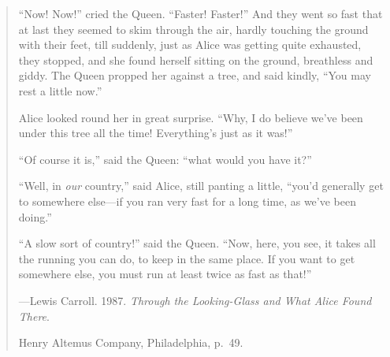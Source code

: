 

\cleardoublepage{}

\thispagestyle{empty} %

\vspace*{50 mm}

\small{}

\begin{quote}
	``Now! Now!'' cried the Queen. 
	``Faster! Faster!'' 
	And they went so fast that at last they seemed to skim through the air, 
	hardly touching the ground with their feet, 
	till suddenly, 
	just as Alice was getting quite exhausted, 
	they stopped, 
	and she found herself sitting on the ground, 
	breathless and giddy. 
	The Queen propped her against a tree, and said kindly, 
	``You may rest a little now.''

	Alice looked round her in great surprise. 
	``Why, I do believe we've been under this tree all the time! 
	Everything's just as it was!''

	``Of course it is,'' said the Queen: ``what would you have it?'' %

	``Well, in \emph{our} country,'' said Alice, still panting a little, %
	``you'd generally get to somewhere else---if you ran very fast for a long time, 
	as we've been doing.''

	``A slow sort of country!'' said the Queen. 
	``Now, here, you see, it takes all the running you can do, to keep in the same place. 
	If you want to get somewhere else, you must run at least twice as fast as that!''

	\vspace{3 mm} %
	
	{
		\setlength{\parskip}{0.0pt} %
		\hfill---Lewis Carroll. 1987.
				 \emph{Through the Looking-Glass and What Alice Found There}.
	
		\hfill Henry Altemus Company, Philadelphia, p.~49.
	}
\end{quote}

\normalsize{}



